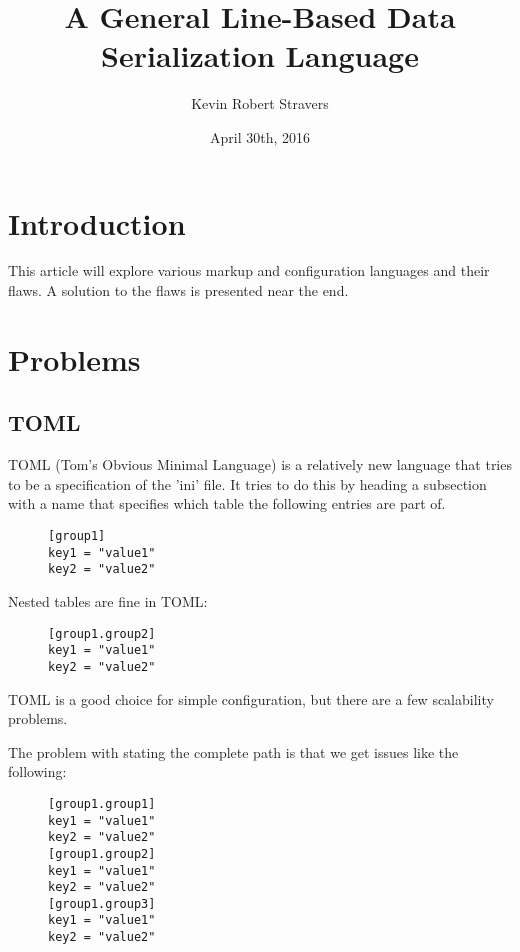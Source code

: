 \documentclass[listof=totoc]{article}
\title{A General Line-Based Data Serialization Language}
\author{Kevin Robert Stravers}
\date{April 30th, 2016}
\begin{document}
\maketitle

\iffalse
  \tableofcontents
  \lstlistoflistings
\fi

\section{Introduction}
\noindent This article will explore various markup and configuration languages and their flaws. A solution to the flaws is presented near the end.

\section{Problems}
\subsection{TOML}
\noindent TOML (Tom's Obvious Minimal Language) is a relatively new language that tries to be a specification of the 'ini' file.
It tries to do this by heading a subsection with a name that specifies which table the following entries are part of.


\begin{figure}[H]
\centering
\begin{varwidth}{\linewidth}
\begin{verbatim}
[group1]
key1 = "value1"
key2 = "value2"
\end{verbatim}
\end{varwidth}
\caption{}
\end{figure}

\noindent Nested tables are fine in TOML:

\begin{figure}[H]
\centering
\begin{varwidth}{\linewidth}
\begin{verbatim}
[group1.group2]
key1 = "value1"
key2 = "value2"
\end{verbatim}
\end{varwidth}
\caption{}
\end{figure}

\noindent TOML is a good choice for simple configuration, but there are a few scalability problems.


\noindent The problem with stating the complete path is that we get issues like the following:


\begin{figure}[H]
\centering
\begin{varwidth}{\linewidth}
\begin{verbatim}
[group1.group1]
key1 = "value1"
key2 = "value2"
[group1.group2]
key1 = "value1"
key2 = "value2"
[group1.group3]
key1 = "value1"
key2 = "value2"
\end{verbatim}
\end{varwidth}
\caption{}
\end{figure}
\end{document}
